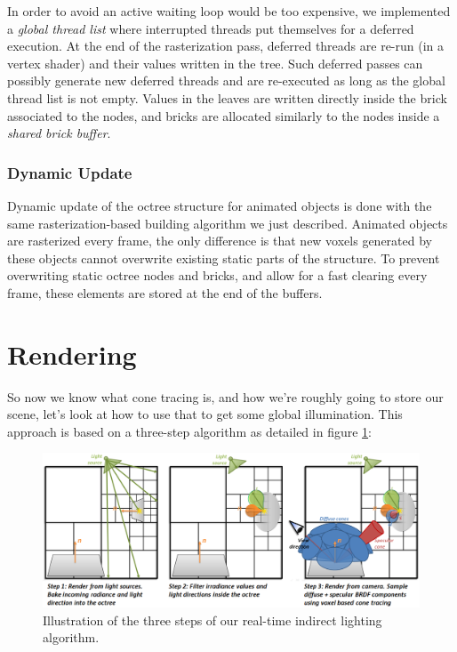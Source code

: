 In order to avoid an active waiting loop would be too expensive, we implemented a \textit{global thread list} where interrupted threads put themselves for a deferred execution. At the end of the rasterization pass, deferred threads are re-run (in a vertex shader) and their values written in the tree. Such deferred passes can possibly generate new deferred threads and are re-executed as long as the global thread list is not empty. Values in the leaves are written directly inside the brick associated to the nodes, and bricks are allocated similarly to the nodes inside a \textit{shared brick buffer}. 




\subsubsection{Dynamic Update}
Dynamic update of the octree structure for animated objects is done with the same rasterization-based building algorithm we just described. Animated objects are rasterized every frame, the only difference is that new voxels generated by these objects cannot overwrite existing static parts of the structure. To prevent overwriting static octree nodes and bricks, and allow for a fast clearing every frame, these elements are stored at the end of the buffers.





\section{Rendering}
So now we know what cone tracing is, and how we're roughly going to store our scene, let's look at how to use that to get some global illumination. This approach is based on a three-step algorithm as detailed in figure \ref{f:vct-steps}:

\begin{figure}\label{f:vct-steps}
	\includegraphics{graphics/vct/vct-3}
	\caption{Illustration of the three steps of our real-time indirect lighting algorithm.}
\end{figure}


